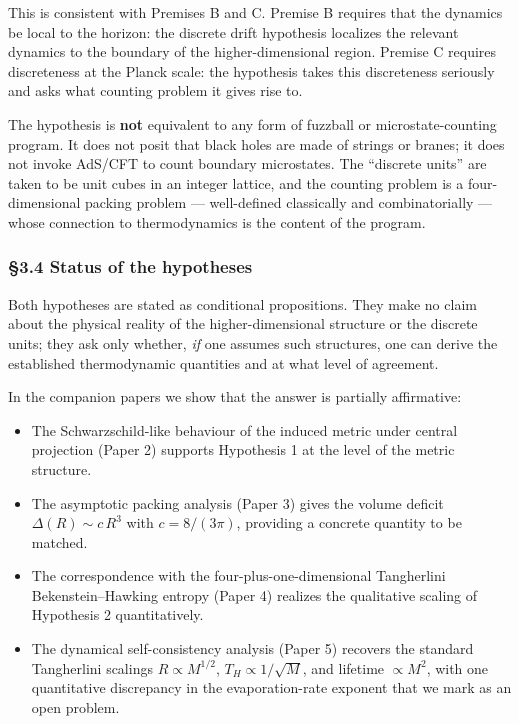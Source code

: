 \documentclass[a4paper,11pt]{article}
\theoremstyle{definition}
\providecommand{\tightlist}{\setlength{\itemsep}{0pt}\setlength{\parskip}{0pt}}
\begin{document}
This is consistent with Premises B and C. Premise B requires that the
dynamics be local to the horizon: the discrete drift hypothesis
localizes the relevant dynamics to the boundary of the
higher-dimensional region. Premise C requires discreteness at the Planck
scale: the hypothesis takes this discreteness seriously and asks what
counting problem it gives rise to.

The hypothesis is \textbf{not} equivalent to any form of fuzzball or
microstate-counting program. It does not posit that black holes are made
of strings or branes; it does not invoke AdS/CFT to count boundary
microstates. The ``discrete units'' are taken to be unit cubes in an
integer lattice, and the counting problem is a four-dimensional packing
problem --- well-defined classically and combinatorially --- whose
connection to thermodynamics is the content of the program.

\subsubsection{§3.4 Status of the
hypotheses}\label{status-of-the-hypotheses}

Both hypotheses are stated as conditional propositions. They make no
claim about the physical reality of the higher-dimensional structure or
the discrete units; they ask only whether, \emph{if} one assumes such
structures, one can derive the established thermodynamic quantities and
at what level of agreement.

In the companion papers we show that the answer is partially
affirmative:

\begin{itemize}
\tightlist
\item
  The Schwarzschild-like behaviour of the induced metric under central
  projection (Paper 2) supports Hypothesis 1 at the level of the metric
  structure.
\item
  The asymptotic packing analysis (Paper 3) gives the volume deficit
  \(\Delta(R) \sim c\,R^3\) with \(c = 8/(3\pi)\), providing a concrete
  quantity to be matched.
\item
  The correspondence with the four-plus-one-dimensional Tangherlini
  Bekenstein--Hawking entropy (Paper 4) realizes the qualitative scaling
  of Hypothesis 2 quantitatively.
\item
  The dynamical self-consistency analysis (Paper 5) recovers the
  standard Tangherlini scalings \(R \propto M^{1/2}\),
  \(T_H \propto 1/\sqrt{M}\), and lifetime \(\propto M^2\), with one
  quantitative discrepancy in the evaporation-rate exponent that we mark
  as an open problem.
\end{itemize}
\end{document}
